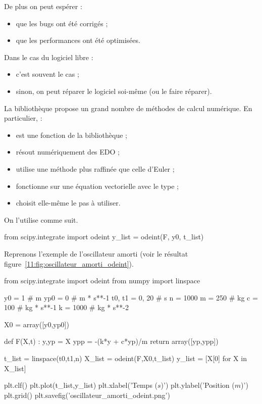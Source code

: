 
De plus on peut espérer :
\begin{itemize}
\item que les bugs ont été corrigés ;
\item que les performances ont été optimisées.
\end{itemize}

Dans le cas du logiciel libre :
\begin{itemize}
\item c'est souvent le cas ; 
\item sinon, on peut réparer le logiciel soi-même (ou le faire réparer).
\end{itemize}

La bibliothèque  propose un grand nombre de méthodes de calcul numérique. En particulier,  :
\begin{itemize}
\item est une fonction de la bibliothèque  ;
\item résout numériquement des EDO ;
\item utilise une méthode plus raffinée que celle d'Euler ;
\item fonctionne sur une équation vectorielle avec le type  ;
\item choisit elle-même le pas à utiliser.
\end{itemize}

On l'utilise comme suit.
\begin{pyverbatim}
from scipy.integrate import odeint
y_list = odeint(F, y0, t_list)
\end{pyverbatim}

Reprenons l'exemple de l'oscillateur amorti (voir le résultat figure~\ref{11:fig:oscillateur_amorti_odeint}).
\begin{pyverbatim}
from scipy.integrate import odeint
from numpy import linspace

y0 = 1 # m
yp0 = 0 # m * s**-1
t0, t1 = 0, 20 # s
n = 1000
m = 250 # kg
c = 100 # kg * s**-1
k = 1000 # kg * s**-2

X0 = array([y0,yp0])

def F(X,t) :
    y,yp = X
    ypp = -(k*y + c*yp)/m
    return array([yp,ypp])

t_list = linspace(t0,t1,n)
X_list = odeint(F,X0,t_list)
y_list = [X[0] for X in X_list]

plt.clf()
plt.plot(t_list,y_list)
plt.xlabel('Temps ($s$)')
plt.ylabel('Position ($m$)')
plt.grid()
plt.savefig('oscillateur_amorti_odeint.png')
\end{pyverbatim}


